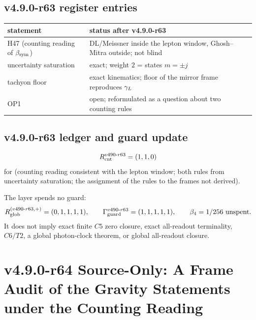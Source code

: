\subsection*{v4.9.0-r63 register entries}
\label{subsec:v490-r63-register}

\begin{center}
\small
\begin{tabular}{@{}>{\raggedright\arraybackslash}p{}>{\raggedright\arraybackslash}p{}@{}}
\toprule
statement & status after v4.9.0-r63\\
\midrule
H47 (counting reading of \(\beta_{\mathrm{sym}}\)) & DL/Meissner inside the lepton window, Ghosh--Mitra outside; not blind\\
uncertainty saturation & exact; weight \(2\) = states \(m=\pm j\)\\
tachyon floor & exact kinematics; floor of the mirror frame reproduces \(\gamma_L\)\\
OP1 & open; reformulated as a question about two counting rules\\
\bottomrule
\end{tabular}
\end{center}

\subsection*{v4.9.0-r63 ledger and guard update}
\label{subsec:v490-r63-ledger-guard}

\[
R_{\rm cnt}^{v490\text{-}r63}=(1,1,0)
\]
for (counting reading consistent with the lepton window; both rules from uncertainty saturation; the assignment of the rules to the frames not derived).

The layer spends no guard:
\[
R_{\rm glob}^{(v490\text{-}r63,+)}=(0,1,1,1,1),
\qquad
\Gamma_{\rm guard}^{v490\text{-}r63}=(1,1,1,1,1),
\qquad
\beta_4=1/256\ \text{unspent}.
\]
It does not imply exact finite \(C5\) zero closure, exact all-readout terminality,
\(C6/T2\), a global photon-clock theorem, or global all-readout closure.

\clearpage
\section*{v4.9.0-r64 Source-Only: A Frame Audit of the Gravity Statements under the Counting Reading}
\label{sec:v490-r64-gravity-audit}

